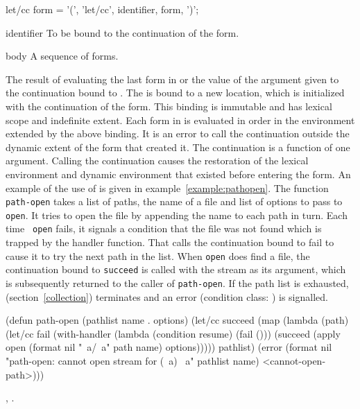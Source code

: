 \begin{optDefinition}

%
\Syntax
\savesyntax{}\vbox{\syntax
let/cc form
   = '(', 'let/cc', identifier, {form}, ')';
\endsyntax}
%
\begin{arguments}
    \item[identifier] To be bound to the continuation of the 
    form.
    \item[body] A sequence of forms.
\end{arguments}
%
\result%
The result of evaluating the last form in  or the value of
the argument given to the continuation bound to .
%
\remarks%
The  is bound to a new location, which is initialized with the
continuation of the  form.  This binding is immutable and has
lexical scope and indefinite extent.  Each form in  is evaluated in order
in the environment extended by the above binding.  It is an error to call the
continuation outside the dynamic extent of the  form that
created it.  The continuation is a function of one argument.  Calling the
continuation causes the restoration of the lexical environment and dynamic
environment that existed before entering the  form.
%
\examples%
An example of the use of  is given in
example~\ref{example:pathopen}.  The function {\tt path-open} takes a list of
paths, the name of a file and list of options to pass to {\tt open}.  It tries
to open the file by appending the name to each path in turn.  Each time {\tt
    open} fails, it signals a condition that the file was not found which is
trapped by the handler function.  That calls the continuation bound to fail to
cause it to try the next path in the list.  When {\tt open} does find a file,
the continuation bound to {\tt succeed} is called with the stream as its
argument, which is subsequently returned to the caller of {\tt path-open}.  If
the path list is exhausted,  (section~\ref{collection})
terminates and an error (condition class: ) is
signalled.
%
\begin{example}
\label{example:pathopen}
{\syntax
(defun path-open (pathlist name . options)
  (let/cc succeed
    (map
      (lambda (path)
        (let/cc fail
          (with-handler
            (lambda (condition resume) (fail ()))
            (succeed (apply open
                       (format nil "~a/~a" path name)
                       options)))))
      pathlist)
    (error
      (format nil
        "path-open: cannot open stream for (~a) ~a"
        pathlist name)
      <cannot-open-path>)))
\endsyntax}
\end{example}
%
\seealso%
, .


\end{optDefinition}
